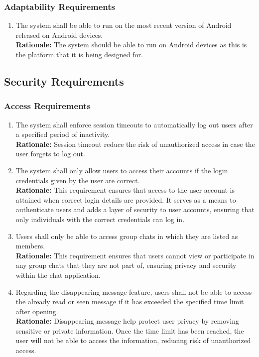 \documentclass[]{article}
\begin{document}
\subsubsection{Adaptability Requirements}
\label{ssub:adaptability_requirements}
\begin{enumerate}[{MS-A}1. ]
    \item The system shall be able to run on the most recent version of Android released on Android devices. \\
    {\bf Rationale:} The system should be able to run on Android devices as this is the platform that it is being designed for.
\end{enumerate}


\subsection{Security Requirements}
\label{sub:security_requirements}
\subsubsection{Access Requirements}
\label{ssub:access_requirements}
\begin{enumerate}[{SR-AC}1. ]
    \item The system shall enforce session timeouts to automatically log out users after a specified period of inactivity. \\
    {\bf Rationale:} Session timeout reduce the risk of unauthorized access in case the user forgets to log out.
    \item The system shall only allow users to access their accounts if the login credentials given by the user are correct. \\
    {\bf Rationale:} This requirement ensures that access to the user account is attained when correct login details are provided. 
    It serves as a means to authenticate users and adds a layer of security to user accounts, ensuring that only individuals with the 
    correct credentials can log in.
    \item Users shall only be able to access group chats in which they are listed as members. \\
    {\bf Rationale:} This requirement ensures that users cannot view or participate in any group chats that 
    they are not part of, ensuring privacy and security within the chat application.
    \item Regarding the disappearing message feature, users shall not be able to access the already read or seen message if it has exceeded the specified time limit
    after opening. \\
    {\bf Rationale:} Disappearing message help protect user privacy by removing sensitive or private information.
    Once the time limit has been reached, the user will not be able to access the information, reducing risk
    of unauthorized access.
\end{enumerate}
\end{document}
